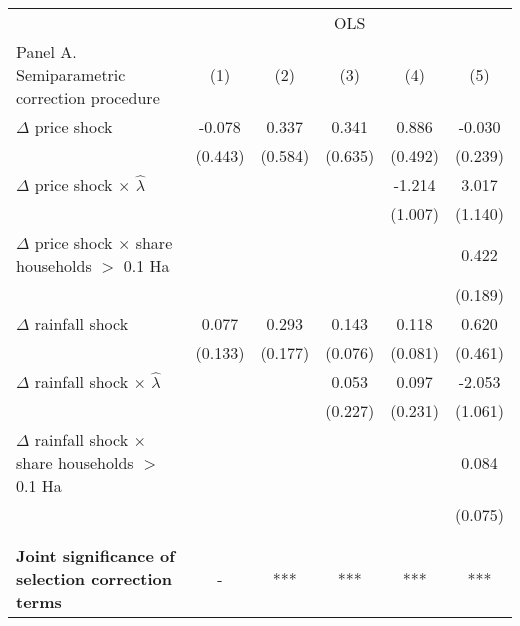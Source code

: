 \begin{table}[H]
\centering\begingroup\fontsize{10}{12}\selectfont

\begin{tabular}{lccccc}
\toprule
\multicolumn{1}{c}{ } & \multicolumn{5}{c}{OLS} \\
\cmidrule(l{3pt}r{3pt}){2-6}
Panel A. Semiparametric correction procedure & (1) & (2) & (3) & (4) & (5)\\
\midrule
$\Delta$ price shock & -0.078 & 0.337 & 0.341 & 0.886 & -0.030\\
 & (0.443) & (0.584) & (0.635) & (0.492) & (0.239)\\
$\Delta$ price shock $\times$ $\widehat{\lambda}$ &  &  &  & -1.214 & 3.017\\
 &  &  &  & (1.007) & (1.140)\\
$\Delta$ price shock $\times$ share households $>$ 0.1 Ha &  &  &  &  & 0.422\\
\addlinespace
 &  &  &  &  & (0.189)\\
$\Delta$ rainfall shock & 0.077 & 0.293 & 0.143 & 0.118 & 0.620\\
 & (0.133) & (0.177) & (0.076) & (0.081) & (0.461)\\
$\Delta$ rainfall shock $\times$ $\widehat{\lambda}$ &  &  & 0.053 & 0.097 & -2.053\\
 &  &  & (0.227) & (0.231) & (1.061)\\
\addlinespace
$\Delta$ rainfall shock $\times$ share households $>$ 0.1 Ha &  &  &  &  & 0.084\\
 &  &  &  &  & (0.075)\\
 &  &  &  &  & \\
 &  &  &  &  & \\
\textbf{Joint significance of selection correction terms} & - & *** & *** & *** & ***\\

\end{tabular}
\endgroup{}
\end{table}
